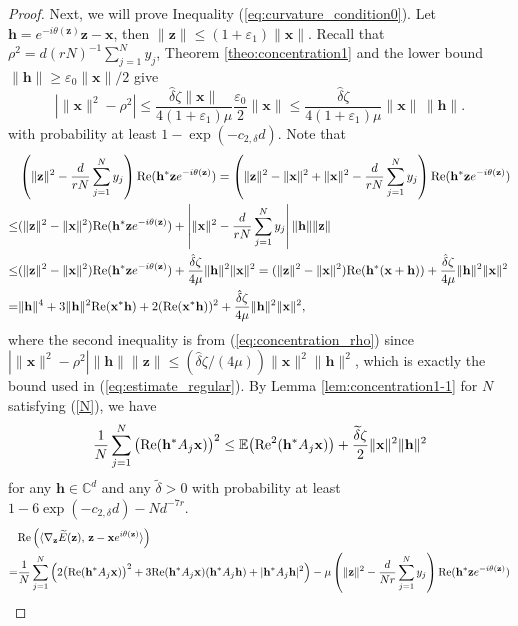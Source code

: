 \documentclass{article}
\renewcommand{\eqref}[1]{(\ref{#1})}
\newcommand{\C}{{\mathbb C}}
\newcommand{\E}{{\mathbb E}}
\newcommand{\re}{{\rm Re}}
\newcommand{\vx}{{\mathbf x}}
\newcommand{\vz}{{\mathbf z}}
\newcommand{\vh}{{\mathbf h}}
\newcommand{\0}{{\mathbf 0}}
\numberwithin{equation}{section}
\begin{document}
\begin{proof}
		Next, we will prove Inequality \eqref{eq:curvature_condition0}. 
		Let $\vh=e^{-i\theta(\vz)}\vz-\vx$, then $\|\vz\|\le(1+\varepsilon_1)\|\vx\|$.   
		Recall that $\rho^2=d(rN)^{-1}\sum_{j=1}^Ny_j$, Theorem \ref{theo:concentration1} and the lower bound $\|\vh\|\ge\varepsilon_0\|\vx\|/2$ give
		\begin{equation}\label{eq:concentration_rho}
			\left|\|\vx\|^2-\rho^2\right|
			\le\frac{\hat\delta\zeta\|\vx\|}{4(1+\varepsilon_1)\mu}
			\frac{\varepsilon_0}{2}\|\vx\|
			\leq\frac{\hat\delta\zeta}{4(1+\varepsilon_1)\mu}\|\vx\|\,\|\vh\|.
		\end{equation}
		with probability at least $1-\exp(-c_{2,\delta} d)$.  
		Note that
		\begin{align}
			&\left(\|\vz\|^2-\frac{d}{rN}\sum^N_{j=1}y_j\right)\re(\vh^*\vz e^{-i\theta(\vz)})=\left(\|\vz\|^2-\|\vx\|^2+\|\vx\|^2-\frac{d}{rN}\sum^N_{j=1}y_j\right)\re(\vh^*\vz e^{-i\theta(\vz)})\nonumber\\
			\le &(\|\vz\|^2-\|\vx\|^2)\re(\vh^*\vz e^{-i\theta(\vz)})+\left|\|\vx\|^2-\frac{d}{rN}\sum^N_{j=1}y_j\right|\|\vh\|\|\vz\|\nonumber\\
			\le &(\|\vz\|^2-\|\vx\|^2)\re(\vh^*\vz e^{-i\theta(\vz)})+\frac{\hat\delta\zeta}{4\mu}\|\vh\|^2\|\vx\|^2
			=(\|\vz\|^2-\|\vx\|^2)\re(\vh^*(\vx+\vh))+\frac{\hat\delta\zeta}{4\mu}\|\vh\|^2\|\vx\|^2\nonumber\\=&\|\vh\|^4+3\|\vh\|^2\re(\vx^*\vh)+2(\re(\vx^*\vh))^2+\frac{\hat\delta\zeta}{4\mu}\|\vh\|^2\|\vx\|^2,\label{eq:estimate_regular}
		\end{align}
		where the second inequality is from \eqref{eq:concentration_rho} since
		$\left|\|\vx\|^2-\rho^2\right|\|\vh\|\|\vz\|
		\le(\hat\delta\zeta/(4\mu))\|\vx\|^2\|\vh\|^2$, which is exactly the bound used in \eqref{eq:estimate_regular}.
		By Lemma \ref{lem:concentration1-1}  for $ N $ satisfying \eqref{N}, we have
		\begin{equation}
			\label{eq:real_part_tilde}
			\frac{1}{N}\sum^N_{j=1}\big(\re(\vh^*A_j\vx)\big)^2
			\le \E\big(\re^2(\vh^*A_j\vx)\big)+\frac{\widetilde\delta\zeta}{2}\|\vx\|^2\|\vh\|^2
		\end{equation}
		for any $ \vh\in\C^d $ and any $\widetilde\delta>0$ with probability at least $1-6\exp(-c_{2,\delta} d)-Nd^{-7r}$.
		\begin{align*}
			&\re\left(\langle\nabla_{\vz} \widetilde{E}(\vz),\,\vz-\vx e^{i\theta(\vz)}\rangle\right)\\
			=&\frac{1}{N}\sum^N_{j=1}\left(2\big(\re(\vh^*A_j\vx)\big)^2
			+3\re(\vh^*A_j\vx)(\vh^*A_j\vh)+|\vh^*A_j\vh|^2\right)-\mu\left(\|\vz\|^2-\frac{d}{Nr}\sum^N_{j=1}y_j\right)\re(\vh^*\vz e^{-i\theta(\vz)})\\

\end{align*}
\end{proof}
\end{document}
